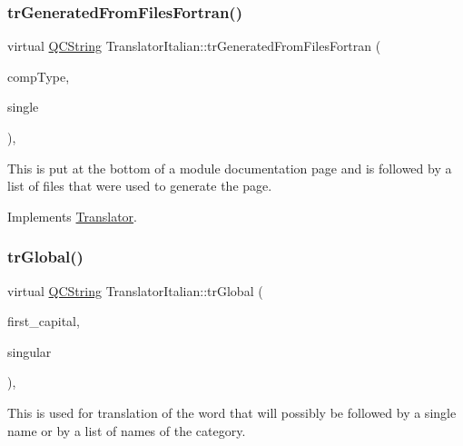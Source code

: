 \mbox{\label{class_translator_italian_ac0128b1da131fea6585acd3cbb7ab7ff}} 
\subsubsection{\texorpdfstring{trGeneratedFromFilesFortran()}{trGeneratedFromFilesFortran()}}
{\footnotesize\ttfamily virtual \mbox{\hyperlink{class_q_c_string}{Q\+C\+String}} Translator\+Italian\+::tr\+Generated\+From\+Files\+Fortran (\begin{DoxyParamCaption}\item[{\mbox{\hyperlink{class_class_def_ae70cf86d35fe954a94c566fbcfc87939}{Class\+Def\+::\+Compound\+Type}}}]{comp\+Type,  }\item[{bool}]{single }\end{DoxyParamCaption})\hspace{0.3cm}{\ttfamily [inline]}, {\ttfamily [virtual]}}

This is put at the bottom of a module documentation page and is followed by a list of files that were used to generate the page. 

Implements \mbox{\hyperlink{class_translator}{Translator}}.

\mbox{\label{class_translator_italian_aff44c031990e38bcc000124cd4c7dd8d}} 
\subsubsection{\texorpdfstring{trGlobal()}{trGlobal()}}
{\footnotesize\ttfamily virtual \mbox{\hyperlink{class_q_c_string}{Q\+C\+String}} Translator\+Italian\+::tr\+Global (\begin{DoxyParamCaption}\item[{bool}]{first\+\_\+capital,  }\item[{bool}]{singular }\end{DoxyParamCaption})\hspace{0.3cm}{\ttfamily [inline]}, {\ttfamily [virtual]}}

This is used for translation of the word that will possibly be followed by a single name or by a list of names of the category. 

